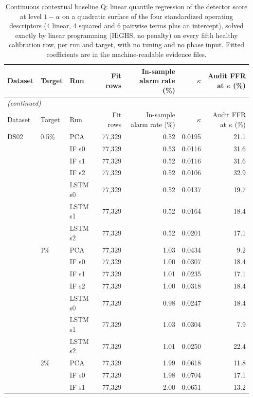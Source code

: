 \begin{scriptsize}
\begin{longtable}{lllrrrr}
\caption{Continuous contextual baseline Q: linear quantile regression of the detector score at level $1-\alpha$ on a quadratic surface of the four standardized operating descriptors (4 linear, 4 squared and 6 pairwise terms plus an intercept), solved exactly by linear programming (HiGHS, no penalty) on every fifth healthy calibration row, per run and target, with no tuning and no phase input. Fitted coefficients are in the machine-readable evidence files.}\label{tab:s18_baseline}\\
\toprule
Dataset & Target & Run & Fit rows & In-sample alarm rate (\%) & $\kappa$ & Audit FFR at $\kappa$ (\%) \\
\midrule
\endfirsthead
\multicolumn{7}{l}{\emph{(continued)}}\\
\toprule
Dataset & Target & Run & Fit rows & In-sample alarm rate (\%) & $\kappa$ & Audit FFR at $\kappa$ (\%) \\
\midrule
\endhead
\bottomrule
\endfoot
DS02 & 0.5\% & PCA & 77,329 & 0.52 & 0.0195 & 21.1 \\
 &  & IF s0 & 77,329 & 0.53 & 0.0116 & 31.6 \\
 &  & IF s1 & 77,329 & 0.52 & 0.0116 & 31.6 \\
 &  & IF s2 & 77,329 & 0.52 & 0.0106 & 32.9 \\
 &  & LSTM s0 & 77,329 & 0.52 & 0.0137 & 19.7 \\
 &  & LSTM s1 & 77,329 & 0.52 & 0.0164 & 18.4 \\
 &  & LSTM s2 & 77,329 & 0.52 & 0.0201 & 17.1 \\
 & 1\% & PCA & 77,329 & 1.03 & 0.0434 & 9.2 \\
 &  & IF s0 & 77,329 & 1.00 & 0.0307 & 18.4 \\
 &  & IF s1 & 77,329 & 1.01 & 0.0235 & 17.1 \\
 &  & IF s2 & 77,329 & 1.00 & 0.0318 & 18.4 \\
 &  & LSTM s0 & 77,329 & 0.98 & 0.0247 & 18.4 \\
 &  & LSTM s1 & 77,329 & 1.03 & 0.0304 & 7.9 \\
 &  & LSTM s2 & 77,329 & 1.01 & 0.0250 & 22.4 \\
 & 2\% & PCA & 77,329 & 1.99 & 0.0618 & 11.8 \\
 &  & IF s0 & 77,329 & 1.98 & 0.0704 & 17.1 \\
 &  & IF s1 & 77,329 & 2.00 & 0.0651 & 13.2 \\

\end{longtable}
\end{scriptsize}
